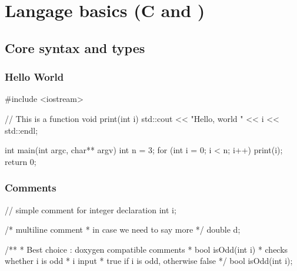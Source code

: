 \section[Basics]{Langage basics (C and \cpp)}

\subsection[Core]{Core syntax and types}

\begin{frame}[fragile]
  \frametitle{Hello World}
  \begin{cppcode}
    #include <iostream>

    // This is a function
    void print(int i) {
      std::cout << "Hello, world " << i << std::endl;
    }

    int main(int argc, char** argv) {
      int n = 3;
      for (int i = 0; i < n; i++) {
        print(i);
      }
      return 0;
    }
  \end{cppcode}
\end{frame}

\begin{frame}[fragile]
  \frametitle{Comments}
  \begin{cppcode}
    // simple comment for integer declaration
    int i;

    /* multiline comment
     * in case we need to say more
     */
    double d;

    /**
     * Best choice : doxygen compatible comments
     * \fn bool isOdd(int i)
     * \brief checks whether i is odd
     * \param i input
     * \return true if i is odd, otherwise false
     */
    bool isOdd(int i);
  \end{cppcode}
\end{frame}

